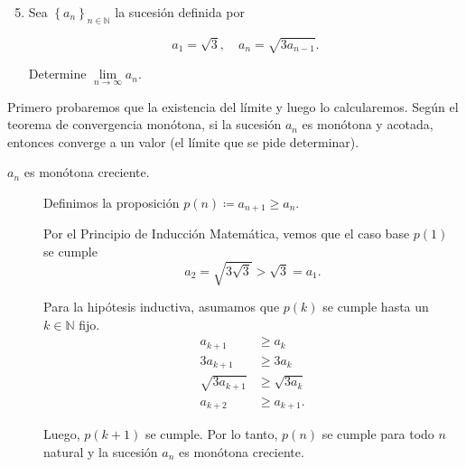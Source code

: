 \documentclass[
	spanish,
	8pt,
	utf8,
	xcolor=table,
	handout,
	aspectratio=169,
	professionalfonts,
	mathserif,
	leqno,
]{beamer}
\begin{document}
\begin{frame}

	\begin{enumerate}\setcounter{enumi}{4}
		\item

		      Sea $\left\{a_{n}\right\}_{n\in\mathbb{N}}$ la sucesión
		      definida por

		      \begin{equation*}
			      a_{1}=\sqrt{3},\quad
			      a_{n}=\sqrt{3a_{n-1}}.
		      \end{equation*}

		      Determine $\lim\limits_{n\to\infty}a_{n}$.
	\end{enumerate}

	\begin{solution}
		Primero probaremos que la \alert{existencia del límite} y luego
		lo calcularemos.
		Según el teorema de convergencia monótona, si la sucesión
		$a_{n}$ es monótona y acotada, entonces converge a un valor
		(el límite que se pide determinar).

		\begin{description}
			\item[$a_{n}$ es monótona creciente.]

				Definimos la proposición $p\left(n\right)\coloneqq a_{n+1}\geq a_{n}$.

				Por el \alert{Principio de Inducción Matemática}, vemos que
				el caso base $p\left(1\right)$ se cumple
				\begin{equation*}
					a_{2}=\sqrt{3\sqrt3}>
					\sqrt{3}=a_{1}.
				\end{equation*}

				Para la hipótesis inductiva, asumamos que $p\left(k\right)$ se
				cumple hasta un $k\in\mathbb{N}$ fijo.
				\begin{align*}
					a_{k+1}         & \geq a_{k}        \\
					3a_{k+1}        & \geq 3a_{k}       \\
					\sqrt{3a_{k+1}} & \geq\sqrt{3a_{k}} \\
					a_{k+2}         & \geq a_{k+1}.
				\end{align*}

				Luego, $p\left(k+1\right)$ se cumple.
				Por lo tanto, $p\left(n\right)$ se cumple para todo $n$ natural
				y la sucesión $a_{n}$ es monótona creciente.

		\end{description}
	\end{solution}
\end{frame}
\end{document}
